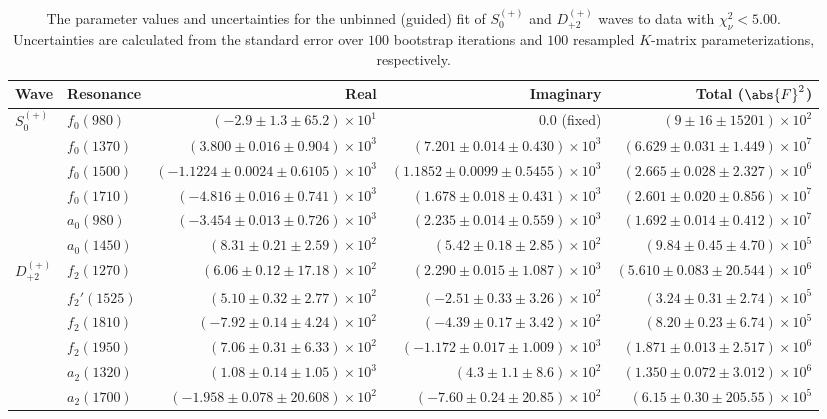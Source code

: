 \begin{table}[ht]
    \begin{center}
        \begin{tabular}{llrrr}\toprule
        Wave & Resonance & Real & Imaginary & Total ($\abs{F}^2$) \\\midrule
$S_{0}^{(+)}$ & $f_{0}(980)$ & $(-2.9 \pm 1.3 \pm 65.2) \times 10^{1}$ & $0.0$ (fixed) & $(9 \pm 16 \pm 15201) \times 10^{2}$ \\
 & $f_{0}(1370)$ & $(3.800 \pm 0.016 \pm 0.904) \times 10^{3}$ & $(7.201 \pm 0.014 \pm 0.430) \times 10^{3}$ & $(6.629 \pm 0.031 \pm 1.449) \times 10^{7}$ \\
 & $f_{0}(1500)$ & $(-1.1224 \pm 0.0024 \pm 0.6105) \times 10^{3}$ & $(1.1852 \pm 0.0099 \pm 0.5455) \times 10^{3}$ & $(2.665 \pm 0.028 \pm 2.327) \times 10^{6}$ \\
 & $f_{0}(1710)$ & $(-4.816 \pm 0.016 \pm 0.741) \times 10^{3}$ & $(1.678 \pm 0.018 \pm 0.431) \times 10^{3}$ & $(2.601 \pm 0.020 \pm 0.856) \times 10^{7}$ \\
 & $a_{0}(980)$ & $(-3.454 \pm 0.013 \pm 0.726) \times 10^{3}$ & $(2.235 \pm 0.014 \pm 0.559) \times 10^{3}$ & $(1.692 \pm 0.014 \pm 0.412) \times 10^{7}$ \\
 & $a_{0}(1450)$ & $(8.31 \pm 0.21 \pm 2.59) \times 10^{2}$ & $(5.42 \pm 0.18 \pm 2.85) \times 10^{2}$ & $(9.84 \pm 0.45 \pm 4.70) \times 10^{5}$ \\
$D_{+2}^{(+)}$ & $f_{2}(1270)$ & $(6.06 \pm 0.12 \pm 17.18) \times 10^{2}$ & $(2.290 \pm 0.015 \pm 1.087) \times 10^{3}$ & $(5.610 \pm 0.083 \pm 20.544) \times 10^{6}$ \\
 & $f_{2}'(1525)$ & $(5.10 \pm 0.32 \pm 2.77) \times 10^{2}$ & $(-2.51 \pm 0.33 \pm 3.26) \times 10^{2}$ & $(3.24 \pm 0.31 \pm 2.74) \times 10^{5}$ \\
 & $f_{2}(1810)$ & $(-7.92 \pm 0.14 \pm 4.24) \times 10^{2}$ & $(-4.39 \pm 0.17 \pm 3.42) \times 10^{2}$ & $(8.20 \pm 0.23 \pm 6.74) \times 10^{5}$ \\
 & $f_{2}(1950)$ & $(7.06 \pm 0.31 \pm 6.33) \times 10^{2}$ & $(-1.172 \pm 0.017 \pm 1.009) \times 10^{3}$ & $(1.871 \pm 0.013 \pm 2.517) \times 10^{6}$ \\
 & $a_{2}(1320)$ & $(1.08 \pm 0.14 \pm 1.05) \times 10^{3}$ & $(4.3 \pm 1.1 \pm 8.6) \times 10^{2}$ & $(1.350 \pm 0.072 \pm 3.012) \times 10^{6}$ \\
 & $a_{2}(1700)$ & $(-1.958 \pm 0.078 \pm 20.608) \times 10^{2}$ & $(-7.60 \pm 0.24 \pm 20.85) \times 10^{2}$ & $(6.15 \pm 0.30 \pm 205.55) \times 10^{5}$ \\\bottomrule
        \end{tabular}
    \caption{The parameter values and uncertainties for the unbinned (guided) fit of $S_{0}^{(+)}$ and $D_{+2}^{(+)}$ waves to data with $\chi^2_\nu < 5.00$. Uncertainties are calculated from the standard error over $100$ bootstrap iterations and $100$ resampled $K$-matrix parameterizations, respectively.}\label{tab:unbinned-fit-chisqdof-5.0-guided-resampled-Sp0p-Dp2p}
    \end{center}
\end{table}
